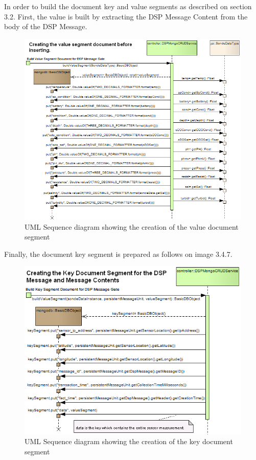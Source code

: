 In order to build the document key and value segments as described on section
3.2. First, the value is built by extracting the DSP Message Content from the
body of the DSP Message.

\begin{figure}[!b]
  \centering
  \includegraphics[scale=0.5]{../diagrams/From-Creating-Value-Segment-Sequence}
  \caption{UML Sequence diagram showing the creation of the value document segment}
  \label{fig:From-Creating-Value-Segment-Sequence}
\end{figure}

Finally, the document key segment is prepared as follows on image 3.4.7.

\begin{figure}[!b]
  \centering
  \includegraphics[scale=0.5]{../diagrams/From-Creating-Key-Segment-Sequence}
  \caption{UML Sequence diagram showing the creation of the key document segment}
  \label{fig:From-Creating-Key-Segment-Sequence}
\end{figure}







